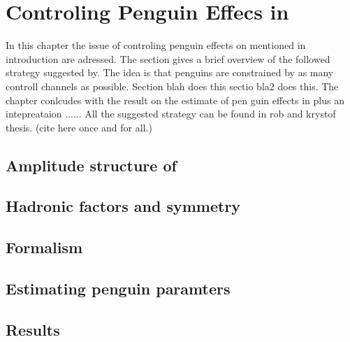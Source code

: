 
\chapter{Controling Penguin Effecs in \phis}
\label{Penguins}

{\color{red}
In this chapter the issue of controling penguin effects on \phis mentioned in introduction are adressed.
The section gives a brief overview of the followed strategy suggested by.
The idea is that penguins are constrained by as many controll channels as possible.
Section blah does this sectio bla2 does this. The chapter conlcudes with the result on the estimate of pen guin effects in \phis
plus an intepreataion ......
All the suggested strategy can be found in rob and krystof thesis. (cite here once and for all.)
}

\section{Amplitude structure of \BsJpsiPhi}
\label{jpsiphi_amp_struct}


\section{Hadronic factors and \grpsuthree symmetry}
\label{had_pars_suthree}


\section{Formalism}
\label{penguin_formalism}


\section{Estimating penguin paramters}
\label{penguin_more_chanells}


\section{Results}
\label{penguin_results}

